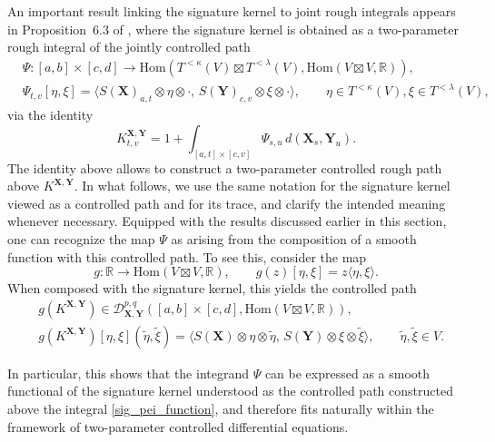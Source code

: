 \documentclass{article}%
\begin{document}
An important result linking the signature kernel to joint rough integrals appears in Proposition~6.3 of \cite{cass2023fubini}, where the signature kernel is obtained as a  two-parameter rough integral of the jointly controlled path
\begin{align*}
    & \Psi : [a,b] \times [c,d] \to \mathrm{Hom}\!\left(T^{<\kappa}(V) \boxtimes T^{<\lambda}(V), \mathrm{Hom}(V \boxtimes V, \mathbb{R})\right), \\
    & \Psi_{t,v}[\eta,\xi]
      = 
        \langle S(\mathbf{X})_{a,t} \otimes \eta \otimes \cdot,\,
                S(\mathbf{Y})_{c,v} \otimes \xi \otimes \cdot \rangle,
        \qquad \eta \in T^{<\kappa}(V), \xi \in T^{<\lambda}(V) ,
\end{align*}
via the identity
\begin{equation} \label{sig_pei_function}
K^{\mathbf{X},\mathbf{Y}}_{t,v}
=
1 + \int_{[a,t]\times[c,v]} \Psi_{s,u}\, d(\mathbf{X}_s,\mathbf{Y}_u).
\end{equation}
The identity above allows to construct a two-parameter controlled rough path above $K^{\mathbf{X}, \mathbf{Y}}$. In what follows, we use the same notation for the signature kernel viewed as a controlled path and for its trace, and clarify the intended meaning whenever necessary. \newline
Equipped with the results discussed earlier in this section, one can recognize the map $\Psi$ as arising from the composition of a smooth function with this controlled path.
To see this, consider the map
\begin{equation}\label{def_g_sig}
g : \mathbb{R} \to \mathrm{Hom}(V \boxtimes V, \mathbb{R}),
\qquad
g(z)[\eta,\xi] = z \langle \eta,\xi\rangle.
\end{equation}
When composed with the signature kernel, this yields the controlled path 
\begin{equation}\label{g_composed_sig}
\begin{aligned}
&g(K^{\mathbf{X},\mathbf{Y}}) \in \mathcal{D}^{p,q}_{\mathbf{X}, \mathbf{Y}}([a,b]\times [c,d], \mathrm{Hom}(V\boxtimes V, \mathbb{R})),\\
&g(K^{\mathbf{X},\mathbf{Y}})[\eta,\xi](\tilde{\eta},\tilde{\xi})
=
\langle S(\mathbf{X}) \otimes \eta \otimes \tilde{\eta},\,
        S(\mathbf{Y}) \otimes \xi \otimes \tilde{\xi} \rangle,
\qquad
\tilde{\eta},\tilde{\xi} \in V.
\end{aligned}
\end{equation}

In particular, this shows that the integrand $\Psi$ can be expressed as a smooth functional of the signature kernel understood as the controlled path constructed above the integral \eqref{sig_pei_function}, and therefore fits naturally within the framework of two-parameter controlled differential equations.
\end{document}
